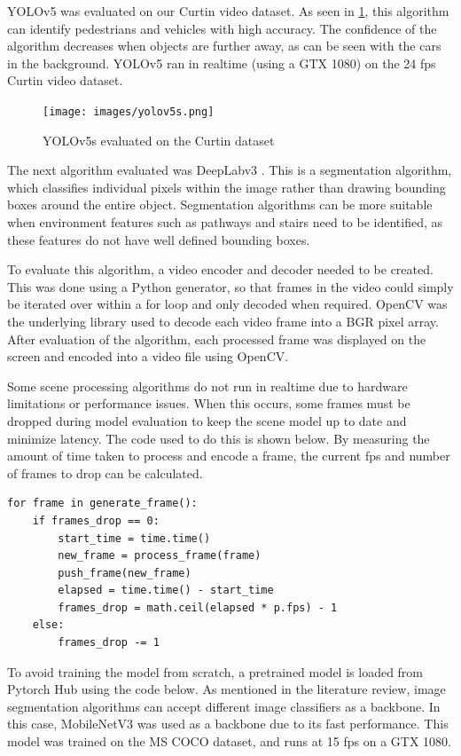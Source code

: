 \documentclass[12pt]{article}
\begin{document}
YOLOv5 was evaluated on our Curtin video dataset. As seen in \cref{fig:yolov5s}, this algorithm can identify pedestrians and vehicles with high accuracy.
The confidence of the algorithm decreases when objects are further away, as can be seen with the cars in the background.
YOLOv5 ran in realtime (using a GTX 1080) on the 24 fps Curtin video dataset.

\begin{figure}[H]
    \centering
    \texttt{[image: images/yolov5s.png]}
    \caption{YOLOv5s evaluated on the Curtin dataset}
    \label{fig:yolov5s}
\end{figure}

The next algorithm evaluated was DeepLabv3 \cite{chenRethinkingAtrousConvolution2017}. This is a segmentation algorithm,
which classifies individual pixels within the image rather than drawing bounding boxes around the entire object.
Segmentation algorithms can be more suitable when environment features such as pathways and stairs need to be identified,
as these features do not have well defined bounding boxes.

To evaluate this algorithm, a video encoder and decoder needed to be created. This was done using a Python generator,
so that frames in the video could simply be iterated over within a for loop and only decoded when required.
OpenCV \cite{bradskiOpenCVLibrary2000} was the underlying library used to decode each video frame into a BGR pixel array.
After evaluation of the algorithm, each processed frame was displayed on the screen and encoded into a video file using OpenCV.

Some scene processing algorithms do not run in realtime due to hardware limitations or performance issues.
When this occurs, some frames must be dropped during model evaluation to keep the scene model up to date and minimize latency.
The code used to do this is shown below. By measuring the amount of time taken to process and encode a frame, the current fps
and number of frames to drop can be calculated.

\begin{verbatim}
for frame in generate_frame():
    if frames_drop == 0:
        start_time = time.time()
        new_frame = process_frame(frame)
        push_frame(new_frame)
        elapsed = time.time() - start_time
        frames_drop = math.ceil(elapsed * p.fps) - 1
    else:
        frames_drop -= 1
\end{verbatim}

To avoid training the model from scratch, a pretrained model is loaded from Pytorch Hub using the code below.
As mentioned in the literature review, image segmentation algorithms can accept different image classifiers as a backbone.
In this case, MobileNetV3 \cite{howardSearchingMobileNetV32019} was used as a backbone due to its fast performance.
This model was trained on the MS COCO \cite{linMicrosoftCOCOCommon2014} dataset, and runs at 15 fps on a GTX 1080.
\end{document}
